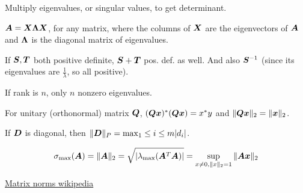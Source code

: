 \documentclass[twoside,10pt]{article}
\begin{document}
Multiply eigenvalues, or singular values, to get determinant.

$\bm{A}=\bm{X}\bm{\Lambda}\bm{X}$, for any matrix, where the columns of $\bm{X}$ are the eigenvectors of $\bm{A}$ and $\bm{\Lambda}$ is the diagonal matrix of eigenvalues.

If $\bm{S}, \bm{T}$ both positive definite, $\bm{S} + \bm{T}$ pos. def. as well. And also $\bm{S}^{-1}$ (since its eigenvalues are $\frac{1}{\lambda}$, so all positive).

If rank is $n$, only $n$ nonzero eigenvalues.

For unitary (orthonormal) matrix $\bm{Q}$, $(\bm{Q}\bm{x})^{*}(\bm{Q}\bm{x}) = x^{*}y$ and $\|\bm{Q}\bm{x}\|_2 = \|\bm{x}\|_2$.

If $\bm{D}$ is diagonal, then $\|\bm{D}\|_P = \max_1\leq i \leq m{|d_i|}$.

  \begin{equation*}
    \sigma_{\mathrm{max}}(\bm{A}) = \|\bm{A}\|_2 = \sqrt{|\lambda_{\mathrm{max}}(\bm{A}^T\bm{A})|} = \sup_{x \neq 0, \|x\|_2 = 1}{\|\bm{A}\bm{x}\|_2}
  \end{equation*}
  
\href{https://en.wikipedia.org/wiki/Matrix_norm#Matrix_norms_induced_by_vector_norms}{Matrix norms wikipedia}
\end{document}
